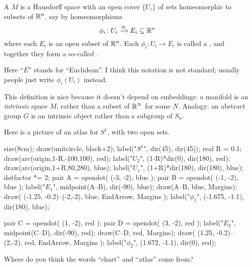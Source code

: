 \begin{definition}
	A  $M$ is a Hausdorff space
	with an open cover $\{U_i\}$ of sets
	homeomorphic to subsets of $\mathbb R^n$,
	say by homeomorphisms
	\[ \phi_i \colon U_i \xrightarrow{\cong} E_i \subseteq \mathbb R^n \]
	where each $E_i$ is an open subset of $\mathbb R^n$.
	Each $\phi_i \colon U_i \to E_i$ is called a ,
	and together they form a so-called .
\end{definition}
\begin{remark}
	Here ``$E$'' stands for ``Euclidean''.
	I think this notation is not standard; usually
	people just write $\phi_i(U_i)$ instead.
\end{remark}
\begin{remark}
	This definition is nice because it doesn't depend on embeddings:
	a manifold is an \emph{intrinsic} space $M$,
	rather than a subset of $\mathbb R^N$ for some $N$.
	Analogy: an abstract group $G$ is an intrinsic object
	rather than a subgroup of $S_n$.
\end{remark}

\begin{example}[An atlas on $S^1$]
Here is a picture of an atlas for $S^1$, with two open sets.
\begin{center}
	\begin{asy}
		size(8cm);
		draw(unitcircle, black+2);
		label("$S^1$", dir(45), dir(45));
		real R = 0.1;
		draw(arc(origin,1-R,-100,100), red);
		label("$U_2$", (1-R)*dir(0), dir(180), red);
		draw(arc(origin,1+R,80,280), blue);
		label("$U_1$", (1+R)*dir(180), dir(180), blue);
		dotfactor *= 2;
		pair A = opendot( (-3, -2), blue );
		pair B = opendot( (-1, -2), blue );
		label("$E_1$", midpoint(A--B), dir(-90), blue);
		draw(A--B, blue, Margins);
		draw( (-1.25, -0.2)--(-2,-2), blue, EndArrow, Margins );
		label("$\phi_1$", (-1.675, -1.1), dir(180), blue);

		pair C = opendot( (1, -2), red );
		pair D = opendot( (3, -2), red );
		label("$E_2$", midpoint(C--D), dir(-90), red);
		draw(C--D, red, Margins);
		draw( (1.25, -0.2)--(2,-2), red, EndArrow, Margins );
		label("$\phi_2$", (1.672, -1.1), dir(0), red);
	\end{asy}
\end{center}
\end{example}

\begin{ques}
	Where do you think the words ``chart'' and ``atlas'' come from?
\end{ques}

